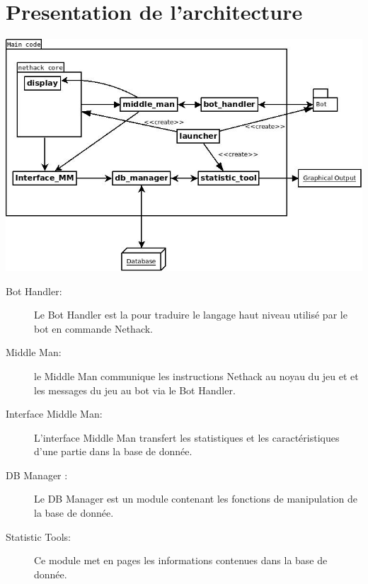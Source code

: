 \section{Presentation de l'architecture}

\includegraphics[width=140mm]{Images/new_archi.jpeg}

\begin{description}
\item[Bot Handler: ] Le Bot Handler est la pour traduire le langage haut niveau utilisé par le bot en commande Nethack.
\item[Middle Man: ] le Middle Man communique les instructions Nethack au noyau du jeu et et les messages du jeu au bot via le Bot Handler.
\item[Interface Middle Man: ] L'interface Middle Man transfert les statistiques et les caractéristiques d'une partie dans la base de donnée.
\item[DB Manager :] Le DB Manager est un module contenant les fonctions de manipulation de la base de donnée.
\item[Statistic Tools:] Ce module met en pages les informations contenues dans la base de donnée.  
\end{description}
